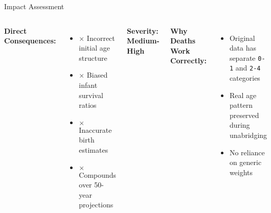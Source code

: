\documentclass[aspectratio=169]{beamer}
\begin{document}
\begin{frame}{Impact Assessment}
\begin{columns}
\textbf{Direct Consequences:}
\begin{itemize}
    \item \textcolor{criticalred}{$\times$} Incorrect initial age structure
    \item \textcolor{warningorange}{$\times$} Biased infant survival ratios
    \item \textcolor{warningorange}{$\times$} Inaccurate birth estimates
    \item \textcolor{criticalred}{$\times$} Compounds over 50-year projections
\end{itemize}

\vspace{0.3cm}

\textbf{Severity: \textcolor{criticalred}{Medium-High}}

\textbf{Why Deaths Work Correctly:}
\begin{itemize}
    \item Original data has separate \texttt{0-1} and \texttt{2-4} categories
    \item Real age pattern preserved during unabridging
    \item No reliance on generic weights
\end{itemize}

\vspace{0.3cm}

\begin{center}
\end{center}
\end{columns}
\end{frame}
\end{document}
